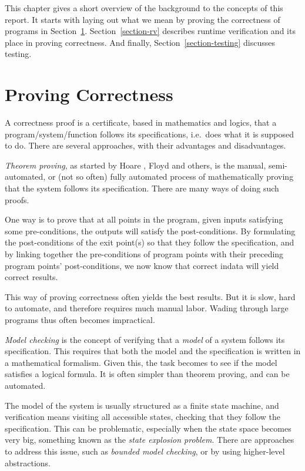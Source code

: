 \documentclass[a4paper,11pt]{kth-mag}
\begin{document}
This chapter gives a short overview of the background to the concepts of this
report. It starts with laying out what we mean by proving the correctness of
programs in Section~\ref{section-proving-correctness}. Section~\ref{section-rv}
describes runtime verification and its place in proving correctness. And
finally, Section~\ref{section-testing} discusses testing.


\section{Proving Correctness} \label{section-proving-correctness}

A correctness proof is a certificate, based in mathematics and logics, that a
program/system/function follows its specifications, i.e.\ does what it is
supposed to do. There are several approaches, with their advantages and
disadvantages.

\textit{Theorem proving}, as started by Hoare \cite{hoare69}, Floyd
\cite{floyd67} and others, is the manual, semi-automated, or (not so often)
fully automated process of mathematically proving that the system follows its
specification. There are many ways of doing such proofs.

One way is to prove that at all points in the program, given inputs satisfying
some pre-conditions, the outputs will satisfy the post-conditions. By
formulating the post-conditions of the exit point(s) so that they follow the
specification, and by linking together the pre-conditions of program points
with their preceding program points' post-conditions, we now know that correct
indata will yield correct results.

This way of proving correctness often yields the best results. But it is slow,
hard to automate, and therefore requires much manual labor. Wading through
large programs thus often becomes impractical.

\textit{Model checking} is the concept of verifying that a \textit{model} of a
system follows its specification. This requires that both the model and the
specification is written in a mathematical formalism. Given this, the task
becomes to see if the model satisfies a logical formula. It is often simpler
than theorem proving, and can be automated.

The model of the system is usually structured as a finite state machine, and
verification means visiting all accessible states, checking that they follow
the specification. This can be problematic, especially when the state space
becomes very big, something known as the \textit{state explosion problem}.
There are approaches to address this issue, such as \textit{bounded model
checking}, or by using higher-level abstractions.
\end{document}
